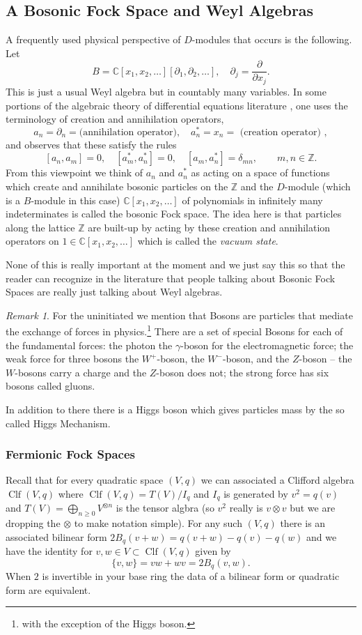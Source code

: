 \documentclass[12pt]{book}
\numberwithin{equation}{section}
\theoremstyle{definition}
\theoremstyle{remark}
\newtheorem{remark}[theorem]{Remark}
\newcommand{\ZZ}{\mathbb{Z}}
\newcommand{\CC}{\mathbb{C}}
\newcommand{\Clf}{\operatorname{Clf}}
\begin{document}
\subsection{A Bosonic Fock Space and Weyl Algebras}
A frequently used physical perspective of $D$-modules that occurs is the following. 
Let  
 $$ B=\CC[x_1,x_2,\ldots][\partial_1,\partial_2,\ldots], \quad \partial_j = \dfrac{\partial}{\partial x_j}.$$
This is just a usual Weyl algebra but in countably many variables. 
In some portions of the algebraic theory of differential equations literature \cite{Sato1983, Miwa2000}, one uses the terminology of creation and annihilation operators,
 $$ a_n = \partial_n =\mbox{(annihilation operator)}, \quad a_n^* = x_n = \mbox{ (creation operator) },$$
and observes that these satisfy the rules 
 $$ [a_n,a_m]=0, \quad [a_m^*,a_n^*]=0, \quad [a_m,a_n^*]= \delta_{mn}, \qquad m,n \in \ZZ.$$
From this viewpoint we think of $a_n$  and $a_n^*$ as acting on a space of functions which create and annihilate bosonic particles on the $\ZZ$ and the $D$-module (which is a $B$-module in this case) $\CC[x_1,x_2,\ldots]$ of polynomials in infinitely many indeterminates is called the bosonic Fock space. 
The idea here is that particles along the lattice $\ZZ$ are built-up by acting by these creation and annihilation operators on $1\in \CC[x_1,x_2,\ldots]$ which is called the \emph{vacuum state}.

None of this is really important at the moment and we just say this so that the reader can recognize in the literature that people talking about Bosonic Fock Spaces are really just talking about Weyl algebras. 

\begin{remark}
For the uninitiated we mention that Bosons are particles that mediate the exchange of forces in physics.\footnote{with the exception of the Higgs boson.} 
There are a set of special Bosons for each of the fundamental forces: the photon the $\gamma$-boson for the electromagnetic force; the weak force for three bosons the $W^+$-boson, the $W^-$-boson, and the $Z$-boson -- the $W$-bosons carry a charge and the $Z$-boson does not; the strong force has  six bosons called gluons.

In addition to there there is a Higgs boson which gives particles mass by the so called Higgs Mechanism.
\end{remark}


\subsubsection{Fermionic Fock Spaces}
Recall that for every quadratic space $(V,q)$ we can associated a Clifford algebra $\Clf(V,q)$ where $\Clf(V,q) = T(V)/I_q$ and $I_q$ is generated by $v^2 = q(v)$ and $T(V) = \bigoplus_{n\geq 0} V^{\otimes n}$ is the tensor algbra (so $v^2$ really is $v\otimes v$ but we are dropping the $\otimes$ to make notation simple).
For any such $(V,q)$ there is an associated bilinear form $2B_q(v+w) = q(v+w)-q(v)-q(w)$ and we have the identity for $v,w \in V \subset \Clf(V,q)$ given by 
 $$ \lbrace v,w\rbrace = vw+wv = 2B_q(v,w).$$
When $2$ is invertible in your base ring the data of a bilinear form or quadratic form are equivalent. 
\end{document}
